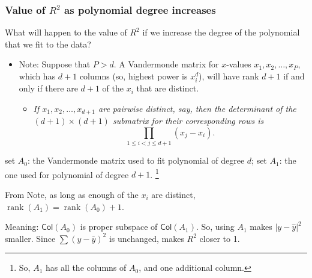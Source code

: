 \documentclass{beamer}
\theoremstyle{example}
\begin{document}
\begin{frame}
    \frametitle{Value of $R^2$ as polynomial degree increases}
    What will happen to the value of $R^2$ if we increase the degree of the polynomial that we fit to the data?

    \pause
    \begin{itemize}
        \item Note: Suppose that $P>d$. A Vandermonde matrix for $x$-values $x_1,x_2,\ldots, x_P$, which has $d+1$ columns (so, highest power is $x_i^d$), will have rank $d+1$ if and only if there are $d+1$ of the $x_i$ that are distinct.
        \pause
        \begin{itemize}
            \item[] \textit{If $x_1,x_2,\ldots,x_{d+1}$ are pairwise distinct, say, then the determinant of the $(d+1)\times(d+1)$ submatrix for their corresponding rows is}
            {\footnotesize
            \[{\displaystyle\prod_{1\le i<j\le d+1}(x_j - x_i)}.\]
            }
        \end{itemize}
    \end{itemize}

    \pause
    set $A_0$: the Vandermonde matrix used to fit polynomial of degree $d$; set $A_1$: the one used for polynomial of degree $d+1$. \footnote{So, $A_{1}$ has all the columns of $A_0$, and one additional column.} 
    
    From Note, as long as enough of the $x_i$ are distinct, $\operatorname{rank}(A_1) = \operatorname{rank}(A_0)+1$.

    \pause
    Meaning: $\textsf{Col}(A_0)$ is proper subspace of $\textsf{Col}(A_1)$. So, using $A_1$ makes $|y - \hat{y}|^2$ smaller. Since $\sum(y - \bar{y})^2$ is unchanged, makes $R^2$ closer to 1.
\end{frame}
\end{document}

